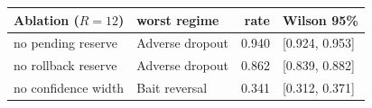 \begin{tabular}{@{}l l r l@{}}
\toprule
Ablation ($R=12$) & worst regime & rate & Wilson 95\% \\
\midrule
no pending reserve & Adverse dropout & 0.940 & [0.924, 0.953] \\
no rollback reserve & Adverse dropout & 0.862 & [0.839, 0.882] \\
no confidence width & Bait reversal & 0.341 & [0.312, 0.371] \\
\bottomrule
\end{tabular}
